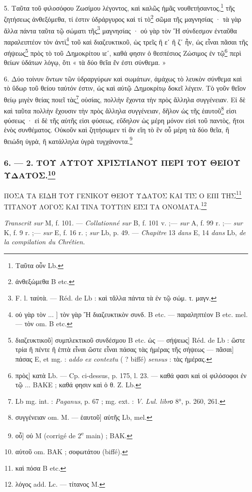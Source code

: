 \documentclass[a4paper, 11pt, oneside, polutonikogreek, french]{article}
\begin{document}
5. Ταῦτα τοῦ φιλοσόφου Ζωσίμου λέγοντος, καὶ καλῶς ἡμᾶς νουθετήσαντος,\footnote{Ταῦτα οὖν Lb.} τῆς ζητήσεως ἀνθεξόμεθα, τί ἐστιν ὑδράργυρος καὶ τί τὸ\footnote{ἀνθεξώμεθα B etc.} σῶμα τῆς μαγνησίας · τὰ γὰρ ἄλλα πάντα ταῦτα τῷ σώματι τῆς\footnote{F. l. ταὐτὰ. --- Réd. de Lb : καὶ τἄλλα πάντα τὰ ἐν τῷ σώμ. τ. μαγν.} μαγνησίας · οὐ γὰρ τὸν Ἤ σύνδεσμον ἐνταῦθα παραλειπτέον τὸν ἀντὶ\footnote{οὐ γὰρ τὸν ... ] τὸν γὰρ Ἤ διαζευκτικὸν συνδ. B etc. --- παραληπτέον B etc. mel. --- τὸν om. B etc.} τοῦ καὶ διαζευκτικοῦ, ὡς τρεῖς ἢ εʹ ἢ ζʹ ἦν, ὡς εἶναι πᾶσαι τῆς σήψεως\footnote{διαζευκτικοῦ] συμπλεκτικοῦ συνδέσμου B etc. ὡς --- σήψεως] Réd. de Lb : ὥστε τρία ἢ πέντε ἢ ἑπτὰ εἶναι ὥστε εἶναι πάσας τὰς ἡμέρας τῆς σήψεως --- πᾶσαι] πάσας E, et mg. : \emph{addo ex contextu} ( ? biffé) \emph{sensus} : τὰς ἡμέρας.} πρὸς τὸ τοῦ Δημοκρίτου ιεʹ, καθά φησιν ὁ θεσπέσιος Ζώσιμος ἐν τῷ\footnote{πρὸς] κατὰ Lb. --- Cp. ci-dessus, p. 175, l. 23. --- καθά φασι καὶ οἱ φιλόσοφοι ἐν τῷ ... BAKE ; καθά φησιν καὶ ὁ θ. Ζ. Lb.} περὶ θείων ὑδάτων λόγῳ, ὅτι « τὰ δύο θεῖα ἕν ἐστι σύνθεμα. »

6. Δύο τοίνυν ὄντων τῶν ὑδραργύρων καὶ σωμάτων, ἀμάχως τὸ λευκὸν σύνθεμα καὶ τὸ ὕδωρ τοῦ θείου ταὐτόν ἐστιν, ὡς καὶ αὐτῷ Δημοκρίτῳ δοκεῖ λέγειν. Τὸ γοῦν θεῖον θείῳ μιγὲν θείας ποιεῖ τὰς\footnote{Lb mg. int. : \emph{Paganus}, p. 67 ; mg. ext. : \emph{V. Lul. librο} 8°, p. 260, 261.} οὐσίας, πολλὴν ἔχοντα τὴν πρὸς ἄλληλα συγγένειαν. Εἰ δὲ καὶ ταῦτα πολλὴν ἔχουσιν τὴν πρὸς ἄλληλα συγγένειαν, δῆλον ὡς τῆς ἑαυτοῦ\footnote{συγγένειαν om. M. --- ἑαυτοῦ] αὐτῆς Lb, mel.} εἰσι φύσεως · εἰ δὲ τῆς αὐτῆς εἰσι φύσεως, εὔδηλον ὡς μέρη μόνον εἰσὶ τοῦ παντὸς, ἤτοι ἑνὸς συνθέματος. Οὐκοῦν καὶ ζητήσωμεν τί ἂν εἴη τὸ ἓν οὗ μέρη τὰ δύο θεῖα, ἢ θειώδη ὑγρὰ, ἢ κατάλληλα ὑγρὰ τυγχάνοντα.\footnote{οὖ] οὐ M (corrigé de 2\textsuperscript{e} main) ; BAK.}

\bigskip
\centerline{\EightStarTaper}
\centerline{\EightStarTaper\EightStarTaper}
\bigskip

\subsubsection[6. --- 2. ΤΟΥ ΑΥΤΟΥ ΧΡΙΣΤΙΑΝΟΥ ΠΕΡΙ ΤΟΥ ΘΕΙΟΥ ΥΔΑΤΟΣ.]{6. --- 2. ΤΟΥ ΑΥΤΟΥ ΧΡΙΣΤΙΑΝΟΥ ΠΕΡΙ ΤΟΥ ΘΕΙΟΥ ΥΔΑΤΟΣ.\footnote{αὐτοῦ om. BAK ; σοφωτάτου (biffé).}}

ΠΟΣΑ ΤΑ ΕΙΔΗ ΤΟΥ ΓΕΝΙΚΟΥ ΘΕΙΟΥ ΥΔΑΤΟΣ ΚΑΙ ΤΙΣ Ο ΕΠΙ ΤΗΣ\footnote{καὶ πόσα B etc.} ΤΙΤΑΝΟΥ ΛΟΓΟΣ ΚΑΙ ΤΙΝΑ ΤΟΥΤΩΝ ΕΙΣΙ ΤΑ ΟΝΟΜΑΤΑ.\footnote{λόγος add. Lc. --- τίτανος M.}

\emph{Transcrit sur} M, f. 101. --- \emph{Collationné sur} B, f. 101 v. ;--- \emph{sur} A, f. 99 r. ;--- \emph{sur} K, f. 9 r. ;--- \emph{sur} E, f. 16 r. ; \emph{sur} Lb, p. 49. --- \emph{Chapitre} 13 \emph{dans} E, 14 \emph{dans} Lb, \emph{de la compilation du Chrétien.}
\end{document}
